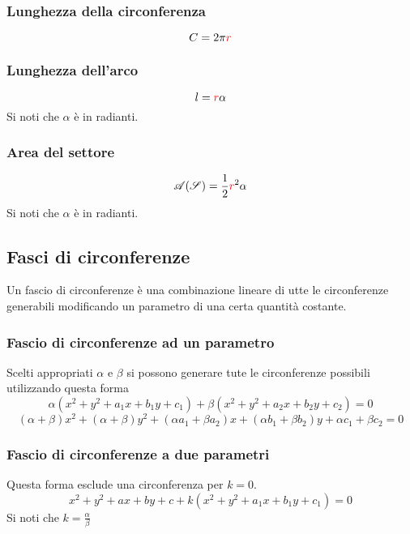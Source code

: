 \subsubsection{Lunghezza della circonferenza}
\begin{equation*}
C = 2\pi\mathcolor{red}{r}
\end{equation*}

\subsubsection{Lunghezza dell'arco}
\begin{equation*}
l = \mathcolor{red}{r}\alpha
\end{equation*}
Si noti che $\alpha$ è in radianti.

\subsubsection{Area del settore}
\begin{equation*}
\mathscr{A}(\mathscr{S}) = \frac{1}{2}\mathcolor{red}{r}^2\alpha
\end{equation*}
Si noti che $\alpha$ è in radianti.

\subsection{Fasci di circonferenze}\label{subsec:geomanal:fasciocirc}
Un fascio di circonferenze è una combinazione lineare di utte le circonferenze generabili modificando
un parametro di una certa quantità costante.

\subsubsection{Fascio di circonferenze ad un parametro}
Scelti appropriati $\alpha$ e $\beta$ si possono generare tute le circonferenze possibili utilizzando 
questa forma
\begin{equation*}
\alpha(x^2+y^2+a_1x+b_1y+c_1) + \beta(x^2+y^2+a_2x+b_2y+c_2) = 0
\end{equation*}
\begin{equation*}
(\alpha+\beta)x^2+(\alpha+\beta)y^2+(\alpha a_1+\beta a_2)x+(\alpha b_1+\beta b_2)y+
\alpha c_1+\beta c_2 = 0
\end{equation*}

\subsubsection{Fascio di circonferenze a due parametri}
Questa forma esclude una circonferenza per $k=0$.
\begin{equation*}
x^2+y^2+ax+by+c+k(x^2+y^2+a_1x+b_1y+c_1) = 0
\end{equation*}
Si noti che $k=\frac{\alpha}{\beta}$

